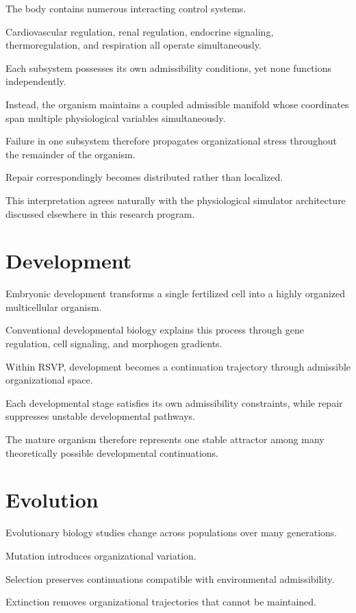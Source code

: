 \documentclass[11pt,oneside]{book}
\numberwithin{equation}{chapter}
\theoremstyle{definition}
\theoremstyle{plain}
\begin{document}
The body contains numerous interacting control systems.

Cardiovascular regulation, renal regulation, endocrine signaling,
thermoregulation, and respiration all operate simultaneously.

Each subsystem possesses its own admissibility conditions, yet none
functions independently.

Instead, the organism maintains a coupled admissible manifold whose
coordinates span multiple physiological variables simultaneously.

Failure in one subsystem therefore propagates organizational stress
throughout the remainder of the organism.

Repair correspondingly becomes distributed rather than localized.

This interpretation agrees naturally with the physiological simulator
architecture discussed elsewhere in this research program.

\section{Development}

Embryonic development transforms a single fertilized cell into a highly
organized multicellular organism.

Conventional developmental biology explains this process through gene
regulation, cell signaling, and morphogen gradients.

Within RSVP, development becomes a continuation trajectory through
admissible organizational space.

Each developmental stage satisfies its own admissibility constraints, while
repair suppresses unstable developmental pathways.

The mature organism therefore represents one stable attractor among many
theoretically possible developmental continuations.

\section{Evolution}

Evolutionary biology studies change across populations over many
generations.

Mutation introduces organizational variation.

Selection preserves continuations compatible with environmental
admissibility.

Extinction removes organizational trajectories that cannot be maintained.
\end{document}
